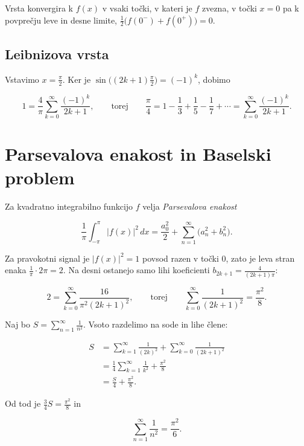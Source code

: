 \documentclass[
  slovene,
]{article}
\begin{document}
Vrsta konvergira k \(f(x)\) v vsaki točki, v kateri je \(f\) zvezna, v
točki \(x = 0\) pa k povprečju leve in desne limite,
\(\frac{1}{2} \bigl( f(0^-) + f(0^+) \bigr) = 0\).

\subsection{Leibnizova vrsta}\label{leibnizova-vrsta}

Vstavimo \(x = \frac{\pi}{2}\). Ker je
\(\sin\bigl((2k + 1)\frac{\pi}{2}\bigr) = (-1)^k\), dobimo

\[1 = \frac{4}{\pi} \sum_{k=0}^{\infty} \frac{(-1)^k}{2k + 1}, \qquad \text{torej} \qquad \frac{\pi}{4} = 1 - \frac{1}{3} + \frac{1}{5} - \frac{1}{7} + \cdots = \sum_{k=0}^{\infty} \frac{(-1)^k}{2k + 1}.\]

\section{Parsevalova enakost in Baselski
problem}\label{parsevalova-enakost-in-baselski-problem}

Za kvadratno integrabilno funkcijo \(f\) velja \emph{Parsevalova
enakost}

\[\frac{1}{\pi} \int_{-\pi}^{\pi} \lvert f(x) \rvert^2 \, dx = \frac{a_0^2}{2} + \sum_{n=1}^{\infty} \bigl( a_n^2 + b_n^2 \bigr).\]

Za pravokotni signal je \(\lvert f(x) \rvert^2 = 1\) povsod razen v
točki \(0\), zato je leva stran enaka \(\frac{1}{\pi} \cdot 2\pi = 2\).
Na desni ostanejo samo lihi koeficienti
\(b_{2k+1} = \frac{4}{(2k + 1)\pi}\):

\[2 = \sum_{k=0}^{\infty} \frac{16}{\pi^2 (2k + 1)^2}, \qquad \text{torej} \qquad \sum_{k=0}^{\infty} \frac{1}{(2k + 1)^2} = \frac{\pi^2}{8}.\]

Naj bo \(S = \sum_{n=1}^{\infty} \frac{1}{n^2}\). Vsoto razdelimo na
sode in lihe člene:

\[\begin{aligned}
S &= \sum_{k=1}^{\infty} \frac{1}{(2k)^2} + \sum_{k=0}^{\infty} \frac{1}{(2k + 1)^2} \\
&= \frac{1}{4} \sum_{k=1}^{\infty} \frac{1}{k^2} + \frac{\pi^2}{8} \\
&= \frac{S}{4} + \frac{\pi^2}{8}.
\end{aligned}\]

Od tod je \(\frac{3}{4} S = \frac{\pi^2}{8}\) in

\[\boxed{\sum_{n=1}^{\infty} \frac{1}{n^2} = \frac{\pi^2}{6}.}\]
\end{document}
